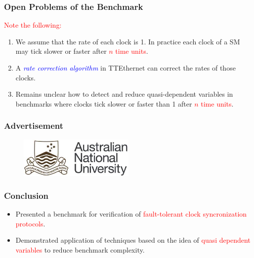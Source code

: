 \documentclass[serif]{beamer}
\begin{document}
\begin{frame}\frametitle{\textbf{Open Problems of the Benchmark}}
\textcolor{red}{Note the following:}  
\begin{enumerate}
\item We assume that the rate of each clock is 1. In practice each clock of a SM 
			may tick slower or faster after \textcolor{red}{$n$ time units}.
\item A \emph{\textcolor{blue}{rate correction algorithm}} in TTEthernet can correct the rates of those clocks.
\item Remains unclear how to detect and reduce quasi-dependent variables in
			benchmarks where clocks tick slower or faster than 1 after \textcolor{red}{$n$ time units}. 
\end{enumerate}
\end{frame}


\begin{frame}\frametitle{\textbf{Advertisement}}


\begin{figure}[!ht]
  \centering
    \includegraphics[width=0.5\textwidth]{anu}
\end{figure}


\end{frame}


\begin{frame}\frametitle{\textbf{Conclusion}}

\begin{itemize}

\item Presented a benchmark for verification of
  \textcolor{red}{fault-tolerant clock syncronization protocols}.

\item Demonstrated application of techniques based on the idea of
  \textcolor{red}{quasi dependent variables} to reduce benchmark
  complexity.

\end{itemize}

\end{frame}


\end{document}
